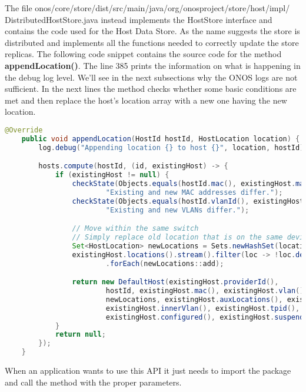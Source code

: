 \documentclass[a4paper,10pt]{memoir}
\begin{document}
The file onos/core/store/dist/src/main/java/org/onosproject/store/host/impl/\\DistributedHostStore.java instead implements the HostStore interface and contains the code used for the Host Data Store. As the name suggests the store is distributed and implements all the functions needed to correctly update the store replicas. The following code snippet contains the source code for the method \textbf{appendLocation()}. The line 385 prints the information on what is happening in the debug log level. We'll see in the next subsections why the ONOS logs are not sufficient. In the next lines the method checks whether some basic conditions are met and then replace the host's location array with a new one having the new location.
\begin{lstlisting}[language=java,firstnumber=384]
    @Override
    public void appendLocation(HostId hostId, HostLocation location) {
        log.debug("Appending location {} to host {}", location, hostId);

        hosts.compute(hostId, (id, existingHost) -> {
            if (existingHost != null) {
                checkState(Objects.equals(hostId.mac(), existingHost.mac()),
                        "Existing and new MAC addresses differ.");
                checkState(Objects.equals(hostId.vlanId(), existingHost.vlan()),
                        "Existing and new VLANs differ.");

                // Move within the same switch
                // Simply replace old location that is on the same device
                Set<HostLocation> newLocations = Sets.newHashSet(location);
                existingHost.locations().stream().filter(loc -> !loc.deviceId().equals(location.deviceId()))
                        .forEach(newLocations::add);

                return new DefaultHost(existingHost.providerId(),
                        hostId, existingHost.mac(), existingHost.vlan(),
                        newLocations, existingHost.auxLocations(), existingHost.ipAddresses(),
                        existingHost.innerVlan(), existingHost.tpid(),
                        existingHost.configured(), existingHost.suspended(), existingHost.annotations());
            }
            return null;
        });
    }
\end{lstlisting}

When an application wants to use this API it just needs to import the package and call the method with the proper parameters.
\end{document}
